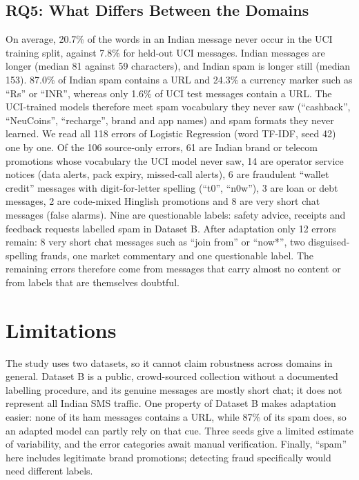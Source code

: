 \documentclass[conference]{IEEEtran}
\begin{document}
\subsection{RQ5: What Differs Between the Domains}
On average, 20.7\% of the words in an Indian message never occur in the UCI training split, against 7.8\% for held-out UCI messages. Indian messages are longer (median 81 against 59 characters), and Indian spam is longer still (median 153). 87.0\% of Indian spam contains a URL and 24.3\% a currency marker such as ``Rs'' or ``INR'', whereas only 1.6\% of UCI test messages contain a URL. The UCI-trained models therefore meet spam vocabulary they never saw (``cashback'', ``NeuCoins'', ``recharge'', brand and app names) and spam formats they never learned. We read all 118 errors of Logistic Regression (word TF-IDF, seed 42) one by one. Of the 106 source-only errors, 61 are Indian brand or telecom promotions whose vocabulary the UCI model never saw, 14 are operator service notices (data alerts, pack expiry, missed-call alerts), 6 are fraudulent ``wallet credit'' messages with digit-for-letter spelling (``t0'', ``n0w''), 3 are loan or debt messages, 2 are code-mixed Hinglish promotions and 8 are very short chat messages (false alarms). Nine are questionable labels: safety advice, receipts and feedback requests labelled spam in Dataset B. After adaptation only 12 errors remain: 8 very short chat messages such as ``join from'' or ``now*'', two disguised-spelling frauds, one market commentary and one questionable label. The remaining errors therefore come from messages that carry almost no content or from labels that are themselves doubtful.

\section{Limitations}
The study uses two datasets, so it cannot claim robustness across domains in general. Dataset B is a public, crowd-sourced collection without a documented labelling procedure, and its genuine messages are mostly short chat; it does not represent all Indian SMS traffic. One property of Dataset B makes adaptation easier: none of its ham messages contains a URL, while 87\% of its spam does, so an adapted model can partly rely on that cue. Three seeds give a limited estimate of variability, and the error categories await manual verification. Finally, ``spam'' here includes legitimate brand promotions; detecting fraud specifically would need different labels.
\end{document}
